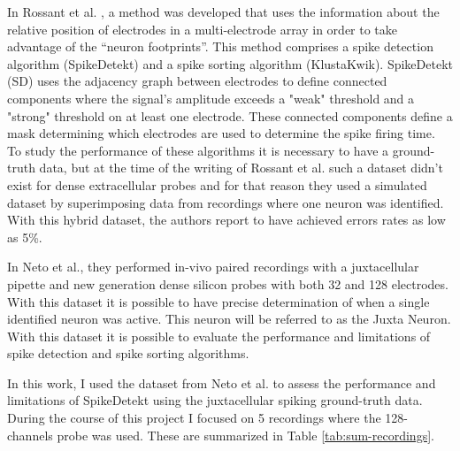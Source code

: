 \documentclass[10pt]{article}
\begin{document}
In Rossant et al. \cite{Rossant2016}, a method was developed that uses the information about the relative position of electrodes in a multi-electrode array in order to take advantage of the “neuron footprints”. This method comprises a spike detection algorithm (SpikeDetekt) and a spike sorting algorithm (KlustaKwik). SpikeDetekt (SD) uses the adjacency graph between electrodes to define connected components where the signal's amplitude exceeds a "weak" threshold and a "strong" threshold on at least one electrode. These connected components define a mask determining which electrodes are used to determine the spike firing time. To study the performance of these algorithms it is necessary to have a ground-truth data, but at the time of the writing of Rossant et al. such a dataset didn't exist for dense extracellular probes and for that reason they used a simulated dataset by superimposing data from recordings where one neuron was identified. With this hybrid dataset, the authors report to have achieved errors rates as low as 5\%.

In Neto et al., they performed in-vivo paired recordings with a juxtacellular pipette and new generation dense silicon probes with both 32 and 128 electrodes. With this dataset it is possible to have precise determination of when a single identified neuron was active. This neuron will be referred to as the Juxta Neuron. With this dataset it is possible to evaluate the performance and limitations of spike detection and spike sorting algorithms.


In this work, I used the dataset from Neto et al. to assess the performance and limitations of SpikeDetekt using the juxtacellular spiking ground-truth data. During the course of this project I focused on 5 recordings where the 128-channels probe was used. These are summarized in Table \ref{tab:sum-recordings}.
\end{document}
